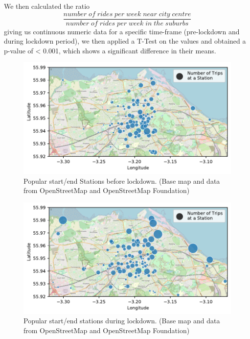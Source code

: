 \documentclass[11pt,a4paper]{article}
\begin{document}
We then calculated the ratio \[ \frac{number \; of \; rides \; per \; week \; near \; city \; centre}{number \; of\; rides \; per \; week \; in \; the \; suburbs} \] giving us continuous numeric data for a specific time-frame (pre-lockdown and during lockdown period), we then applied a T-Test on the values and obtained a p-value of < 0.001, which shows a significant difference in their means. 

\begin{figure}[H]
  \centering
  \includegraphics{report/7.1}
  \caption{Popular start/end Stations before lockdown. (Base map and data from OpenStreetMap and OpenStreetMap Foundation)}
  \label{map1:fig:7.1}
\end{figure}

\begin{figure}[H]
  \centering
  \includegraphics{report/7.2}
  \caption{Popular start/end stations during lockdown. (Base map and data from OpenStreetMap and OpenStreetMap Foundation)}
  \label{map2:fig:7.2}
\end{figure}
\end{document}
